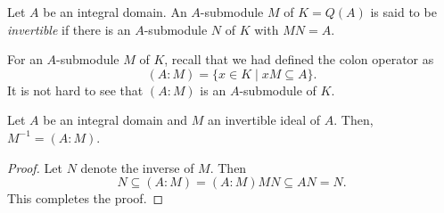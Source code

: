 \begin{definition}
    Let $A$ be an integral domain. An $A$-submodule $M$ of $K = Q(A)$ is said to be \emph{invertible} if there is an $A$-submodule $N$ of $K$ with $MN = A$. 
\end{definition}

For an $A$-submodule $M$ of $K$, recall that we had defined the colon operator as
\begin{equation*}
    (A:M) = \{x\in K\mid xM\subseteq A\}.
\end{equation*}
It is not hard to see that $(A:M)$ is an $A$-submodule of $K$.

\begin{proposition}
    Let $A$ be an integral domain and $M$ an invertible ideal of $A$. Then, $M^{-1} = (A:M)$.
\end{proposition}
\begin{proof}
    Let $N$ denote the inverse of $M$. Then 
    \begin{equation*}
        N\subseteq (A:M) = (A:M)MN\subseteq AN = N.
    \end{equation*}
    This completes the proof.
\end{proof}